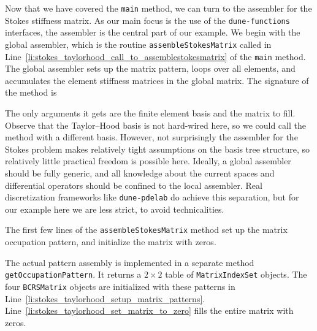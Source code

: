 \documentclass[a4paper,10pt,headings=normal,bibliography=totoc]{scrartcl}
\newcommand{\cpp}[1]{\lstinline[basicstyle=\ttfamily]!#1!}
\newcommand{\dunemodule}[1]{\texttt{#1}}
\begin{document}
Now that we have covered the \cpp{main} method, we can turn to the assembler for the Stokes stiffness matrix.
As our main focus is the use of the \dunemodule{dune-functions} interfaces, the assembler
is the central part of our example.   We begin with the global assembler,
which is the routine \cpp{assembleStokesMatrix} called in Line~\ref{li:stokes_taylorhood_call_to_assemblestokesmatrix}
of the \cpp{main} method.
The global assembler sets up the matrix pattern, loops over all elements, and accumulates the element stiffness
matrices in the global matrix. The signature of the method is
%

%
The only arguments it gets are the finite element basis and the matrix to fill.  Observe that the Taylor--Hood basis is not
hard-wired here, so we could call the method with a different basis.
However, not surprisingly the assembler for the Stokes problem makes relatively tight assumptions on the basis tree
structure, so relatively little practical freedom is possible here.  Ideally, a global assembler should be fully
generic, and all knowledge about the current spaces and differential operators should be confined to the local
assembler.  Real discretization frameworks like \dunemodule{dune-pdelab} do achieve this separation,
but for our example here we are less strict, to avoid technicalities.

The first few lines of the \cpp{assembleStokesMatrix} method set up the matrix occupation pattern, and initialize the matrix with zeros.
%

%
The actual pattern assembly is implemented in a separate method \cpp{getOccupationPattern}.
It returns a $2 \times 2$ table of \cpp{MatrixIndexSet} objects.
The four \cpp{BCRSMatrix} objects are initialized with these patterns in Line~\ref{li:stokes_taylorhood_setup_matrix_patterns}.
Line~\ref{li:stokes_taylorhood_set_matrix_to_zero}
fills the entire matrix with zeros.
\end{document}
